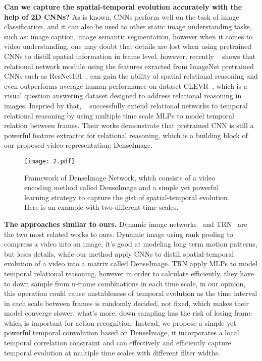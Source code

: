 \documentclass{article}
\begin{document}
\textbf{Can we capture the spatial-temporal evolution accurately with the help of 2D CNNs?} As is known, CNNs perform well on the task of image classification, and it can also be used to other static image understanding tasks, such as: image caption, image semantic segmentation, however when it comes to video understanding, one may doubt that details are lost when using pretrained CNNs to distill spatial information in frame level, however, recently ~\cite{SantoroRBMPBL17} shows that relational network module using the features exracted from ImageNet pretrained CNNs such as ResNet101~\cite{HeZRS16}, can gain the ability of spatial relational reasoning and even outperforms average human performance on dataset CLEVR~\cite{JohnsonHMFZG17}, which is a visual question answering dataset designed to address relational reasoning in images. Inspried by that, ~\cite{abs-1711-08496} successfully extend relational networks to temporal relational reasoning by using multiple time scale MLPs to model temporal relation between frames. Their works demonstrate that pretrained CNN is still a powerful feature extractor for relational reasoning, which is a building block of our proposed video representation: DenseImage.

\begin{figure*}
	\begin{center}
		\texttt{[image: 2.pdf]}
		\caption{Framework of DenseImage Network, which consists of a video encoding method called DenseImage and a simple yet powerful learning strategy to capture the gist of spatial-temporal evolution. Here is an example with two different time scales.}
		\label{Figure 2.}
	\end{center}
	\vspace{-0.5em}
\end{figure*}
\textbf{The approaches similar to ours.} Dynamic image networks~\cite{BilenFGVG16} and TRN~\cite{abs-1711-08496} are the two most related works to ours. Dynamic image using rank pooling to compress a video into an image, it's good at modeling long term motion patterns, but loses details, while our method apply CNNs to distill spatial-temporal evolution of a video into a matrix called DenseImage. TRN apply MLPs to model temporal relational reasoning, however in order to calculate efficiently, they have to down sample from n-frame combinations in each time scale, in our opinion, this operation could cause unstableness of temporal evolution as the time interval in each scale between frames is randomly decided, not fixed, which makes their model converge slower, what's more, down sampling has the risk of losing frame which is important for action recognition. Instead, we propose a simple yet powerful temporal convolution based on DenseImage, it incorporates a local temporal correlation constraint and can effectively and efficiently capture temporal evolution at multiple time scales with different filter widths.
\end{document}
